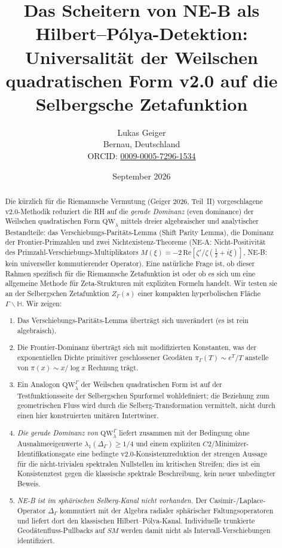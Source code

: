 \documentclass[12pt,a4paper]{article}
\title{Das Scheitern von NE-B als Hilbert--Pólya-Detektion:\\
Universalität der Weilschen quadratischen Form v2.0 auf die Selbergsche Zetafunktion}
\author{Lukas Geiger\\
\small Bernau, Deutschland\\
\small ORCID: \href{https://orcid.org/0009-0005-7296-1534}{0009-0005-7296-1534}}
\date{September 2026}
\theoremstyle{definition}
\theoremstyle{remark}
\newcommand{\HH}{\mathbb{H}}
\newcommand{\QW}{\mathrm{QW}}
\newcommand{\Sel}{Z_{\Gamma}}
\newcommand{\Delop}{\Delta_{\Gamma}}
\begin{document}
\overfullrule=0pt
\setlength{\emergencystretch}{3em}
\maketitle
\vspace{-2.3em}

\begin{abstract}
Die kürzlich für die Riemannsche Vermutung (Geiger 2026,
Teil~II) vorgeschlagene v2.0-Methodik reduziert die RH auf die \emph{gerade Dominanz} (even dominance) der Weilschen quadratischen Form
$\QW_\lambda$ mittels dreier algebraischer und analytischer Bestandteile: das Verschiebungs-Paritäts-Lemma
(Shift Parity Lemma), die Dominanz der Frontier-Primzahlen und zwei Nichtexistenz-Theoreme (NE-A:
Nicht-Positivität des Primzahl-Verschiebungs-Multiplikators $M(\xi) = -2\,\mathrm{Re}[\zeta'/\zeta(\tfrac{1}{2}+i\xi)]$,
NE-B: kein universeller kommutierender Operator). Eine natürliche Frage ist, ob dieser
Rahmen spezifisch für die Riemannsche Zetafunktion ist oder ob es sich um eine
allgemeine Methode für Zeta-Strukturen mit expliziten Formeln handelt. Wir testen sie an der
Selbergschen Zetafunktion $\Sel(s)$ einer kompakten hyperbolischen Fläche
$\Gamma\backslash\HH$. Wir zeigen:

\begin{enumerate}[label=(\roman*),leftmargin=*,itemsep=0.04em,topsep=0.12em,parsep=0pt,partopsep=0pt]
\item Das Verschiebungs-Paritäts-Lemma überträgt sich unverändert (es ist rein algebraisch).
\item Die Frontier-Dominanz überträgt sich mit modifizierten Konstanten, was der
exponentiellen Dichte primitiver geschlossener Geodäten $\pi_\Gamma(T) \sim e^T/T$
anstelle von $\pi(x) \sim x/\log x$ Rechnung trägt.
\item Ein Analogon $\QW^\Gamma_\lambda$ der Weilschen quadratischen Form ist auf
der Testfunktionsseite der Selbergschen Spurformel wohldefiniert; die Beziehung
zum geometrischen Fluss wird durch die Selberg-Transformation vermittelt, nicht
durch einen hier konstruierten unitären Intertwiner.
\item \emph{Die gerade Dominanz von $\QW^\Gamma_\lambda$} liefert zusammen mit
der Bedingung ohne Ausnahmeeigenwerte $\lambda_1(\Delop)\ge 1/4$ und einem
expliziten $C2$/Minimizer-Identifikationsgate eine bedingte
v2.0-Konsistenzreduktion der strengen Aussage für die nicht-trivialen
spektralen Nullstellen im kritischen Streifen; dies
ist ein Konsistenztest gegen die klassische spektrale Beschreibung, kein neuer
unbedingter Beweis.
\item \emph{NE-B ist im sphärischen Selberg-Kanal nicht vorhanden.} Der
Casimir-/Laplace-Operator $\Delop$ kommutiert mit der Algebra radialer
sphärischer Faltungsoperatoren und liefert dort den klassischen
Hilbert--Pólya-Kanal. Individuelle trunkierte Geodätenfluss-Pullbacks auf
$SM$ werden damit nicht als Intervall-Verschiebungen identifiziert.
\end{enumerate}


\end{abstract}
\end{document}

